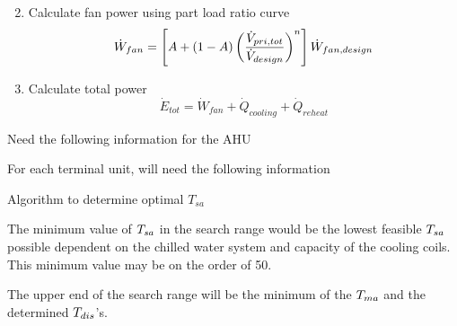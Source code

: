 \begin{enumerate}
\begin{equation}
        \end{equation}
    \item Calculate fan power using part load ratio curve
        \begin{equation}\label{eq:TotalFanPower}
            \dot{W}_{fan} = \left[A + \left(1-A\right)\left(\frac{\dot{V}_{pri,tot}}{\dot{V}_{design}}\right)^{n}\right] \dot{W}_{fan,design} 
        \end{equation}
    \item Calculate total power 
        \begin{equation}\label{eq:TotalPowerSystem}
            \dot{E}_{tot} = \dot{W}_{fan} + \dot{Q}_{cooling} + \dot{Q}_{reheat}
        \end{equation}
\end{enumerate}

\begin{algorithm}
\SetAlgoLined
Need the following information for the AHU\par
{}
For each terminal unit, will need the following information \par
{}



\caption{Algorithm to determine optimal \(T_{sa}\)}
\end{algorithm}



The minimum value of \(T_{sa}\) in the search range would be the lowest
feasible \(T_{sa}\) possible dependent on the chilled water system and
capacity of the cooling coils.  This minimum value may be on the order of
\SI{50}{\degreeF}.

The upper end of the search range will be the minimum of the \(T_{ma}\)
and the determined \(T_{dis}\)'s.

